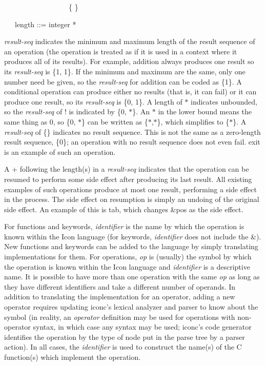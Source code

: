 {\ttfamily\mdseries
\ \ \ \ \ \ \ \ \ \ \ \ \ \ \ \ \ \ \{ \}}

{\ttfamily\mdseries
\ \ \ length ::= integer {\textbar} *}


\textit{result-seq} indicates the minimum and maximum length of the
result sequence of an operation (the operation is treated as if it is
used in a context where it produces all of its results). For example,
addition always produces one result so its \textit{result-seq} is \{1,
1\}. If the minimum and maximum are the same, only one number need be
given, so the \textit{result-seq} for addition can be coded as
\{1\}. A conditional operation can produce either no results (that is,
it can fail) or it can produce one result, so its \textit{result-seq}
is \{0, 1\}. A length of $\ast$ indicates unbounded, so the
\textit{result-seq} of ! is indicated by \{0, $\ast$\}. An $\ast$ in the lower
bound means the same thing as 0, so \{0, $\ast$\} can be written as \{$\ast$,$\ast$\},
which simplifies to \{$\ast$\}. A \textit{result-seq} of \{\} indicates no
result sequence.  This is not the same as a zero-length result
sequence, \{0\}; an operation with no result sequence does not even
fail.  exit is an example of such an operation.

A + following the length(s) in a \textit{result-seq} indicates that
the operation can be resumed to perform some side effect after
producing its last result. All existing examples of such operations
produce at most one result, performing a side effect in the
process. The side effect on resumption is simply an undoing of the
original side effect. An example of this is tab, which changes \&pos
as the side effect.

For functions and keywords, \textit{identifier} is the name by which
the operation is known within the Icon language (for keywords,
\textit{identifier} does not include the \&). New functions and
keywords can be added to the language by simply translating
implementations for them. For operations, \textit{op} is (usually) the
symbol by which the operation is known within the Icon language and
\textit{identifier} is a descriptive name. It is possible to have more
than one operation with the same \textit{op} as long as they have
different identifiers and take a different number of operands.  In
addition to translating the implementation for an operator, adding a
new operator requires updating iconc's lexical analyzer and parser to
know about the symbol (in reality, an \textit{operator} definition may
be used for operations with non-operator syntax, in which case any
syntax may be used; iconc's code generator identifies the operation by
the type of node put in the parse tree by a parser action). In all
cases, the \textit{identifier} is used to construct the name(s) of the
C function(s) which implement the operation.


